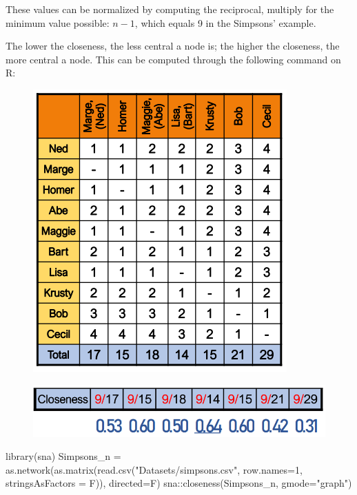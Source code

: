 \documentclass[
  notitlepage,
  onecolumn,
  openany]{book}
\newenvironment{Shaded}{\begin{snugshade}}{\end{snugshade}}
\newcommand{\AttributeTok}[1]{\textcolor[rgb]{0.77,0.63,0.00}{#1}}
\newcommand{\DecValTok}[1]{\textcolor[rgb]{0.00,0.00,0.81}{#1}}
\newcommand{\FunctionTok}[1]{\textcolor[rgb]{0.00,0.00,0.00}{#1}}
\newcommand{\NormalTok}[1]{#1}
\newcommand{\OtherTok}[1]{\textcolor[rgb]{0.56,0.35,0.01}{#1}}
\newcommand{\SpecialCharTok}[1]{\textcolor[rgb]{0.00,0.00,0.00}{#1}}
\newcommand{\StringTok}[1]{\textcolor[rgb]{0.31,0.60,0.02}{#1}}
\begin{document}
These values can be normalized by computing the reciprocal, multiply for the minimum value possible: \(n-1\), which equals 9 in the Simpsons' example.

The lower the closeness, the less central a node is; the higher the closeness, the more central a node. This can be computed through the following command on R:

\begin{figure}[h!]

{\centering \includegraphics[width=0.5\linewidth]{images/04-Centrality/Untitled 1} 

}

\end{figure}

\begin{figure}[h!]

{\centering \includegraphics[width=0.5\linewidth]{images/04-Centrality/Untitled 2} 

}

\end{figure}

\begin{Shaded}
\begin{Highlighting}[]
\FunctionTok{library}\NormalTok{(sna)}
\NormalTok{Simpsons\_n }\OtherTok{=} \FunctionTok{as.network}\NormalTok{(}\FunctionTok{as.matrix}\NormalTok{(}\FunctionTok{read.csv}\NormalTok{(}\StringTok{"Datasets/simpsons.csv"}\NormalTok{, }
                                           \AttributeTok{row.names=}\DecValTok{1}\NormalTok{, }
                                           \AttributeTok{stringsAsFactors =}\NormalTok{ F)),}
                        \AttributeTok{directed=}\NormalTok{F)}
\NormalTok{sna}\SpecialCharTok{::}\FunctionTok{closeness}\NormalTok{(Simpsons\_n, }\AttributeTok{gmode=}\StringTok{"graph"}\NormalTok{)}
\end{Highlighting}
\end{Shaded}
\end{document}
